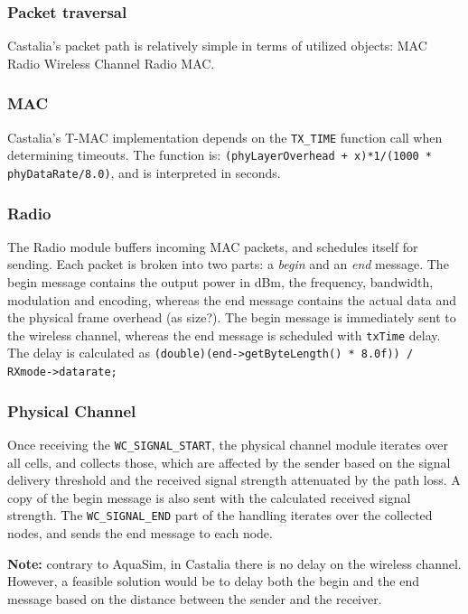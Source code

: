 \documentclass[a4paper]{article}
\begin{document}
\subsubsection{Packet traversal}
Castalia's packet path is relatively simple in terms of utilized objects:
MAC \textrightarrow Radio \textrightarrow Wireless Channel \textrightarrow Radio \textrightarrow MAC.

\subsubsection{MAC}
Castalia's T-MAC implementation depends on the \texttt{TX\_TIME} function call when determining timeouts. The function is: \texttt{(phyLayerOverhead + x)*1/(1000 * phyDataRate/8.0)}, and is interpreted in seconds.

\subsubsection{Radio}
The Radio module buffers incoming MAC packets, and schedules itself for sending. Each packet is broken into two parts: a \textit{begin} and an \textit{end} message. The begin message contains the output power in dBm, the frequency, bandwidth, modulation and encoding, whereas the end message contains the actual data and the physical frame overhead (as size?). The begin message is immediately sent to the wireless channel, whereas the end message is scheduled with \texttt{txTime} delay. The delay is calculated as \texttt{(double)(end->getByteLength() * 8.0f)) / RXmode->datarate;}

\subsubsection{Physical Channel}
Once receiving the \texttt{WC\_SIGNAL\_START}, the physical channel module iterates over all cells, and collects those, which are affected by the sender based on the signal delivery threshold and the received signal strength attenuated by the path loss. A copy of the begin message is also sent with the calculated received signal strength. The \texttt{WC\_SIGNAL\_END} part of the handling iterates over the collected nodes, and sends the end message to each node.

\noindent \textbf{Note:} contrary to AquaSim, in Castalia there is no delay on the wireless channel. However, a feasible solution would be to delay both the begin and the end message based on the distance between the sender and the receiver.
\end{document}
